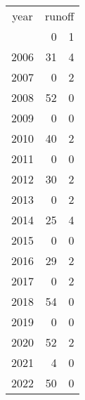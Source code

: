 \footnotesize\begin{tabular}[t]{lrr}
\toprule
\multicolumn{1}{c}{year} & \multicolumn{2}{c}{runoff} \\
\cmidrule(l{3pt}r{3pt}){1-1} \cmidrule(l{3pt}r{3pt}){2-3}
  & 0 & 1\\
\midrule
2006 & 31 & 4\\
2007 & 0 & 2\\
2008 & 52 & 0\\
2009 & 0 & 0\\
2010 & 40 & 2\\
2011 & 0 & 0\\
2012 & 30 & 2\\
2013 & 0 & 2\\
2014 & 25 & 4\\
2015 & 0 & 0\\
2016 & 29 & 2\\
2017 & 0 & 2\\
2018 & 54 & 0\\
2019 & 0 & 0\\
2020 & 52 & 2\\
2021 & 4 & 0\\
2022 & 50 & 0\\
\bottomrule
\end{tabular}
